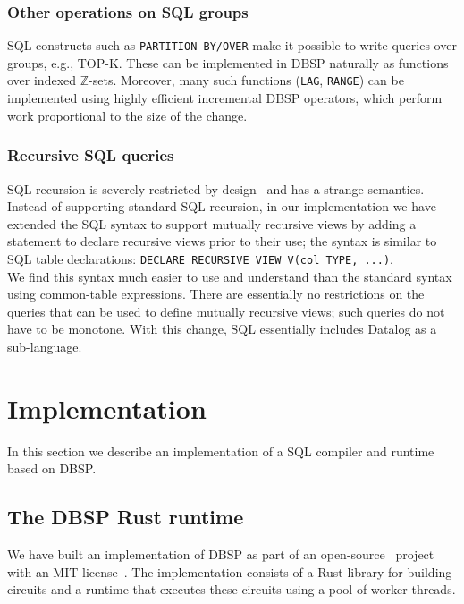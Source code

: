 \documentclass[twocolumn
]{svjour3}
\numberwithin{equation}{section}
\newcommand{\dbsp}{DBSP\xspace}
\newcommand{\zrs}{$\Z$-sets\xspace} %
\newcommand{\code}[1]{\mbox{\texttt{#1}}}
\newcommand{\Z}{\mathbb{Z}}  %
\begin{document}
\subsubsection{Other operations on SQL groups}

SQL constructs such as \code{PARTITION BY/OVER} make it possible to
write queries over groups, e.g., TOP-K.  These can be implemented in
\dbsp naturally as functions over indexed \zrs.  Moreover, many such
functions (\code{LAG}, \code{RANGE}) can be implemented using highly
efficient incremental \dbsp operators, which perform work proportional
to the size of the change.

\subsubsection{Recursive SQL queries}

SQL recursion is severely restricted by design~\cite{hirn-cidr23} and
has a strange semantics.  Instead of supporting standard SQL
recursion, in our implementation we have extended the SQL syntax to
support mutually recursive views by adding a statement to declare
recursive views prior to their use; the syntax is similar to SQL table
declarations: \code{DECLARE RECURSIVE VIEW V(col TYPE, ...)}. \\ We find
this syntax much easier to use and understand than the standard syntax
using common-table expressions.  There are essentially no restrictions
on the queries that can be used to define mutually recursive views;
such queries do not have to be monotone.  With this change, SQL
essentially includes Datalog as a sub-language.


%
\section{Implementation}\label{sec:implementation}

In this section we describe an implementation of a SQL compiler and
runtime based on \dbsp.

\subsection{The \dbsp Rust runtime}\label{sec:runtime}

We have built an implementation of \dbsp as part of an
open-source~\cite{dbsp-repo} project with an MIT
license~\cite{dbsp-crate}.  The implementation consists of a Rust
library for building circuits and a runtime that executes these
circuits using a pool of worker threads.
\end{document}

